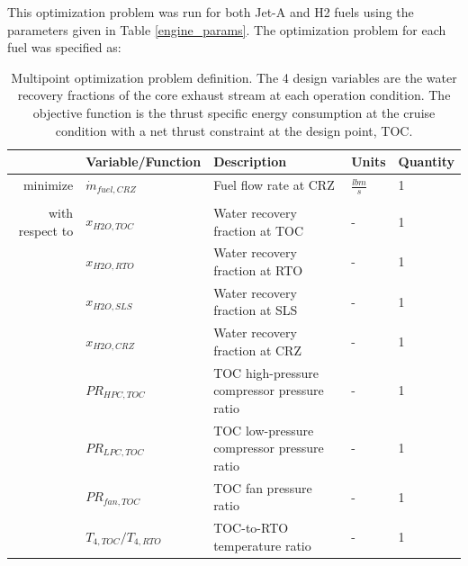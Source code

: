 \documentclass[conf]{new-aiaa}
\begin{document}
This optimization problem was run for both Jet-A and H2 fuels using the parameters given in Table \ref{engine_params}.
The optimization problem for each fuel was specified as:

\begin{table}[h]
    \centering
    \caption{
        Multipoint optimization problem definition.
        The 4 design variables are the water recovery fractions of the core exhaust stream at each operation condition.
        The objective function is the thrust specific energy consumption at the cruise condition with a net thrust constraint at the design point, TOC.
    }
    \small
    \renewcommand{\arraystretch}{1.2}
    \begin{tabular}{r l l l l}
        \toprule
                        & Variable/Function           & Description                                 & Units           & Quantity \\
        \hline
        minimize        & $ \dot{m}_{fuel,CRZ} $      & Fuel flow rate at CRZ                       & $\frac{lbm}{s}$ & 1        \\
                        &                             &                                             &                 &          \\
        with respect to & $x_{H2O,TOC}$               & Water recovery fraction at TOC              & -               & 1        \\
                        & $x_{H2O,RTO}$               & Water recovery fraction at RTO              & -               & 1        \\
                        & $x_{H2O,SLS}$               & Water recovery fraction at SLS              & -               & 1        \\
                        & $x_{H2O,CRZ}$               & Water recovery fraction at CRZ              & -               & 1        \\
                        & $PR_{HPC,TOC}$              & TOC high-pressure compressor pressure ratio & -               & 1        \\
                        & $PR_{LPC,TOC}$              & TOC low-pressure compressor pressure ratio  & -               & 1        \\
                        & $PR_{fan,TOC}$              & TOC fan pressure ratio                      & -               & 1        \\
                        & $T_{4,TOC}/T_{4,RTO}$       & TOC-to-RTO temperature ratio                & -               & 1        \\

\end{tabular}
\end{table}
\end{document}
